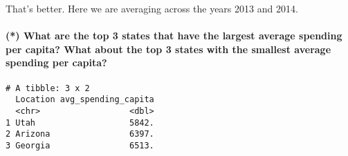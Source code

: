 \documentclass[]{article}
\newenvironment{Shaded}{\begin{snugshade}}{\end{snugshade}}
\newcommand{\CommentTok}[1]{\textcolor[rgb]{0.56,0.35,0.01}{\textit{#1}}}
\newcommand{\DataTypeTok}[1]{\textcolor[rgb]{0.13,0.29,0.53}{#1}}
\newcommand{\DecValTok}[1]{\textcolor[rgb]{0.00,0.00,0.81}{#1}}
\newcommand{\KeywordTok}[1]{\textcolor[rgb]{0.13,0.29,0.53}{\textbf{#1}}}
\newcommand{\NormalTok}[1]{#1}
\newcommand{\OperatorTok}[1]{\textcolor[rgb]{0.81,0.36,0.00}{\textbf{#1}}}
\newcommand{\StringTok}[1]{\textcolor[rgb]{0.31,0.60,0.02}{#1}}
\let\oldparagraph\paragraph
\renewcommand{\paragraph}[1]{\oldparagraph{#1}\mbox{}}
\begin{document}
That's better. Here we are averaging across the years 2013 and 2014.

\hypertarget{what-are-the-top-3-states-that-have-the-largest-average-spending-per-capita-what-about-the-top-3-states-with-the-smallest-average-spending-per-capita}{%
\paragraph{(*) What are the top 3 states that have the largest average
spending per capita? What about the top 3 states with the smallest
average spending per
capita?}\label{what-are-the-top-3-states-that-have-the-largest-average-spending-per-capita-what-about-the-top-3-states-with-the-smallest-average-spending-per-capita}}

\begin{Shaded}
\end{Shaded}

\begin{verbatim}
# A tibble: 3 x 2
  Location avg_spending_capita
  <chr>                  <dbl>
1 Utah                   5842.
2 Arizona                6397.
3 Georgia                6513.
\end{verbatim}

\begin{Shaded}
\end{Shaded}
\end{document}
